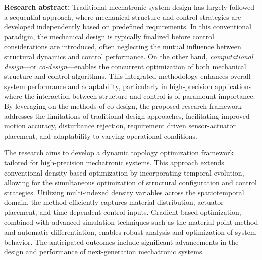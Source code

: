 \textbf{Research abstract:} Traditional mechatronic system design has
largely followed a sequential approach, where mechanical structure and
control strategies are developed independently based on predefined
requirements. In this conventional paradigm, the mechanical design is
typically finalized before control considerations are introduced, often
neglecting the mutual influence between structural dynamics and control
performance. On the other hand, \emph{computational design}---or
\emph{co-design}---enables the concurrent optimization of both
mechanical structure and control algorithms. This integrated methodology
enhances overall system performance and adaptability, particularly in
high-precision applications where the interaction between structure and
control is of paramount importance. By leveraging on the methods of
co-design, the proposed research framework addresses the limitations of
traditional design approaches, facilitating improved motion accuracy,
disturbance rejection, requirement driven sensor-actuator placement, and
adaptability to varying operational conditions.

The research aims to develop a dynamic topology optimization framework
tailored for high-precision mechatronic systems. This approach extends
conventional density-based optimization by incorporating temporal
evolution, allowing for the simultaneous optimization of structural
configuration and control strategies. Utilizing multi-indexed density
variables across the spatiotemporal domain, the method efficiently
captures material distribution, actuator placement, and time-dependent
control inputs. Gradient-based optimization, combined with advanced
simulation techniques such as the material point method and automatic
differentiation, enables robust analysis and optimization of system
behavior. The anticipated outcomes include significant advancements in
the design and performance of next-generation mechatronic systems.

